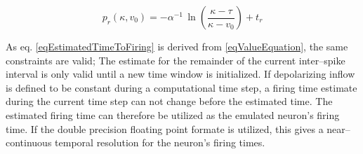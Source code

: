 \begin{equation}
	p_r(\kappa, v_0)  	= -\alpha^{-1} \, \ln \left( \frac{\kappa - \tau}{\kappa - v_0} \right) + t_r
	\label{eqEstimatedTimeToFiring}
\end{equation}

	As eq. \eqref{eqEstimatedTimeToFiring} is derived from \eqref{eqValueEquation}, the same constraints are valid;
		The estimate for the remainder of the current inter--spike interval is only valid until a new time window is initialized.
	If depolarizing inflow is defined to be constant during a computational time step, a firing time estimate during the current time step can not change before the estimated time. %
	The estimated firing time can therefore be utilized as the emulated neuron's firing time. %
	If the double precision floating point formate is utilized, this gives a near--continuous temporal resolution for the neuron's firing times.


